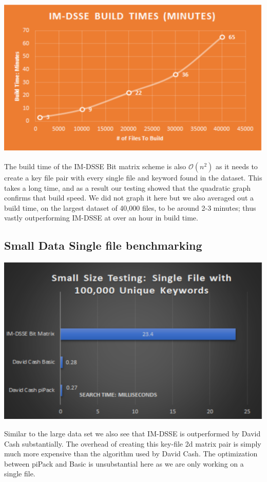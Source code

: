 \includegraphics[width=1\textwidth]{Charts/time.eps}

The build time of the IM-DSSE Bit matrix scheme is also $\mathcal{O}(n^2)$ as it needs to create a key file pair with every single file and keyword found in the dataset. This takes a long time, and as a result our testing showed that the quadratic graph confirms that build speed. We did not graph it here but we also averaged out a build time, on the largest dataset of 40,000 files, to be around 2-3 minutes; thus vastly outperforming IM-DSSE at over an hour in build time.

\subsection{Small Data Single file benchmarking}

\includegraphics[width=.8\textwidth]{Charts/small.eps}

Similar to the large data set we also see that IM-DSSE is outperformed by David Cash substantially. The overhead of creating this key-file 2d matrix pair is simply much more expensive than the algorithm used by David Cash. The optimization between piPack and Basic is unsubstantial here as we are only working on a single file.

